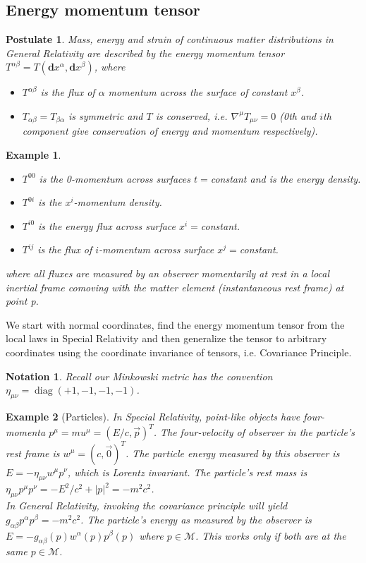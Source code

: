 \documentclass[a4paper]{article}
\DeclareMathOperator{\diag}{diag}
\newtheorem{post}{Postulate}[section]
\newtheorem{eg}{Example}[section]
\newtheorem{notation}{Notation}[section]
\theoremstyle{new}
\begin{document}
\subsection{Energy momentum tensor}
\begin{post}
Mass, energy and strain of continuous matter distributions in General Relativity are described by the energy momentum tensor $T^{\alpha\beta}=T(\mathbf{d}x^\alpha,\mathbf{d}x^\beta)$, where
\begin{itemize}
    \item $T^{\alpha\beta}$ is the flux of $\alpha$ momentum across the surface of constant $x^\beta$.
    \item $T_{\alpha\beta}=T_{\beta\alpha}$ is symmetric and $T$ is conserved, i.e. $\nabla^\mu T_{\mu\nu}=0$ (0th and $i$th component give conservation of energy and momentum respectively).
\end{itemize}
\end{post}
\begin{eg}\leavevmode
\begin{itemize}
    \item $T^{00}$ is the 0-momentum across surfaces $t=$constant and is the energy density. 
    \item $T^{0i}$ is the $x^i$-momentum density. 
    \item $T^{i0}$ is the energy flux across surface $x^i=$constant.
    \item $T^{ij}$ is the flux of $i$-momentum across surface $x^j=$constant.
\end{itemize}
where all fluxes are measured by an observer momentarily at rest in a local inertial frame comoving with the matter element (instantaneous rest frame) at point p.
\end{eg}
We start with normal coordinates, find the energy momentum tensor from the local laws in Special Relativity and then generalize the tensor to arbitrary coordinates using the coordinate invariance of tensors, i.e. Covariance Principle.
\begin{notation}
Recall our Minkowski metric has the convention $\eta_{\mu\nu}=\diag(+1,-1,-1,-1)$.
\end{notation}
\begin{eg}[Particles]
In Special Relativity, point-like objects have four-momenta $p^\mu=mu^\mu=(E/c,\vec{p})^T$. The four-velocity of observer in the particle's rest frame is $w^\mu=(c,\vec{0})^T$. The particle energy measured by this observer is $E=-\eta_{\mu\nu}w^\mu p^\nu$, which is Lorentz invariant. The particle's rest mass is $\eta_{\mu\nu}p^\mu p^\nu=-E^2/c^2+|p|^2=-m^2c^2$.\\[5pt]
In General Relativity, invoking the covariance principle will yield $g_{\alpha\beta}p^\alpha p^\beta=-m^2c^2$. The particle's energy as measured by the observer is $E=-g_{\alpha\beta}(p)w^\alpha(p)p^\beta(p)$ where $p\in\mathcal{M}$. This works only if both are at the same $p\in\mathcal{M}$. 
\end{eg}
\end{document}
